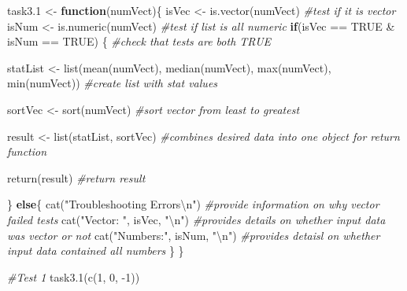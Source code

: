 \documentclass[
]{article}
\newenvironment{Shaded}{\begin{snugshade}}{\end{snugshade}}
\newcommand{\CommentTok}[1]{\textcolor[rgb]{0.56,0.35,0.01}{\textit{#1}}}
\newcommand{\ConstantTok}[1]{\textcolor[rgb]{0.00,0.00,0.00}{#1}}
\newcommand{\ControlFlowTok}[1]{\textcolor[rgb]{0.13,0.29,0.53}{\textbf{#1}}}
\newcommand{\DecValTok}[1]{\textcolor[rgb]{0.00,0.00,0.81}{#1}}
\newcommand{\FloatTok}[1]{\textcolor[rgb]{0.00,0.00,0.81}{#1}}
\newcommand{\FunctionTok}[1]{\textcolor[rgb]{0.00,0.00,0.00}{#1}}
\newcommand{\NormalTok}[1]{#1}
\newcommand{\OtherTok}[1]{\textcolor[rgb]{0.56,0.35,0.01}{#1}}
\newcommand{\SpecialCharTok}[1]{\textcolor[rgb]{0.00,0.00,0.00}{#1}}
\newcommand{\StringTok}[1]{\textcolor[rgb]{0.31,0.60,0.02}{#1}}
\begin{document}
\begin{Shaded}
\begin{Highlighting}[]
\NormalTok{task3}\FloatTok{.1} \OtherTok{\textless{}{-}} \ControlFlowTok{function}\NormalTok{(numVect)\{}
\NormalTok{  isVec }\OtherTok{\textless{}{-}} \FunctionTok{is.vector}\NormalTok{(numVect) }\CommentTok{\#test if it is vector}
\NormalTok{  isNum }\OtherTok{\textless{}{-}} \FunctionTok{is.numeric}\NormalTok{(numVect) }\CommentTok{\#test if list is all numeric}
  \ControlFlowTok{if}\NormalTok{(isVec }\SpecialCharTok{==} \ConstantTok{TRUE} \SpecialCharTok{\&}\NormalTok{ isNum }\SpecialCharTok{==} \ConstantTok{TRUE}\NormalTok{) \{ }\CommentTok{\#check that tests are both TRUE}
    
\NormalTok{    statList }\OtherTok{\textless{}{-}} \FunctionTok{list}\NormalTok{(}\FunctionTok{mean}\NormalTok{(numVect), }\FunctionTok{median}\NormalTok{(numVect), }\FunctionTok{max}\NormalTok{(numVect), }\FunctionTok{min}\NormalTok{(numVect)) }\CommentTok{\#create list with stat values}
    
\NormalTok{    sortVec }\OtherTok{\textless{}{-}} \FunctionTok{sort}\NormalTok{(numVect) }\CommentTok{\#sort vector from least to greatest}

\NormalTok{    result }\OtherTok{\textless{}{-}} \FunctionTok{list}\NormalTok{(statList, sortVec) }\CommentTok{\#combines desired data into one object for return function}
     
    \FunctionTok{return}\NormalTok{(result) }\CommentTok{\#return result}
    
\NormalTok{  \} }\ControlFlowTok{else}\NormalTok{\{}
    \FunctionTok{cat}\NormalTok{(}\StringTok{"Troubleshooting Errors}\SpecialCharTok{\textbackslash{}n}\StringTok{"}\NormalTok{) }\CommentTok{\#provide information on why vector failed tests}
    \FunctionTok{cat}\NormalTok{(}\StringTok{"Vector: "}\NormalTok{, isVec, }\StringTok{"}\SpecialCharTok{\textbackslash{}n}\StringTok{"}\NormalTok{) }\CommentTok{\#provides details on whether input data was vector or not}
    \FunctionTok{cat}\NormalTok{(}\StringTok{"Numbers:"}\NormalTok{, isNum, }\StringTok{"}\SpecialCharTok{\textbackslash{}n}\StringTok{"}\NormalTok{) }\CommentTok{\#provides detaisl on whether input data contained all numbers}
\NormalTok{  \}}
\NormalTok{\}}

\CommentTok{\#Test 1}
\FunctionTok{task3.1}\NormalTok{(}\FunctionTok{c}\NormalTok{(}\DecValTok{1}\NormalTok{, }\DecValTok{0}\NormalTok{, }\SpecialCharTok{{-}}\DecValTok{1}\NormalTok{))}
\end{Highlighting}
\end{Shaded}
\end{document}

